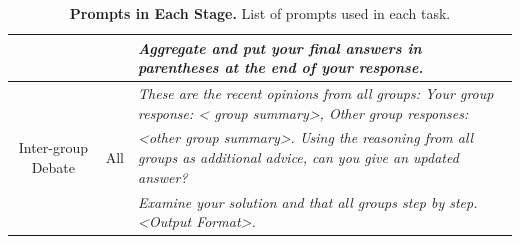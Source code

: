 \begin{table}[t]
{\begin{tabular}{ccl}
     & & \emph{Aggregate and put your final answers in parentheses at the end of your response. }\\
     \midrule
     \multirow{3}{*}{Inter-group Debate}  & \multirow{3}{*}{All} & \emph{These are the recent opinions from all groups: Your group response: < group summary>, Other group responses: } \\
      & & \emph{<other group summary>. Using the reasoning from all groups as additional advice, can you give an updated answer?} \\
      & & \emph{Examine your solution and that all groups step by step. <Output Format>.} \\
    \bottomrule
\end{tabular}

}
\caption{\textbf{Prompts in Each Stage.} List of prompts used in each task. }
\label{tab:input-prompts}
\end{table}


\begin{table}[t]
\centering
{}
\caption{\textbf{Output Format Requirements in Each Dataset.}}
\label{tab:Requirements}
\end{table}

\newpage

